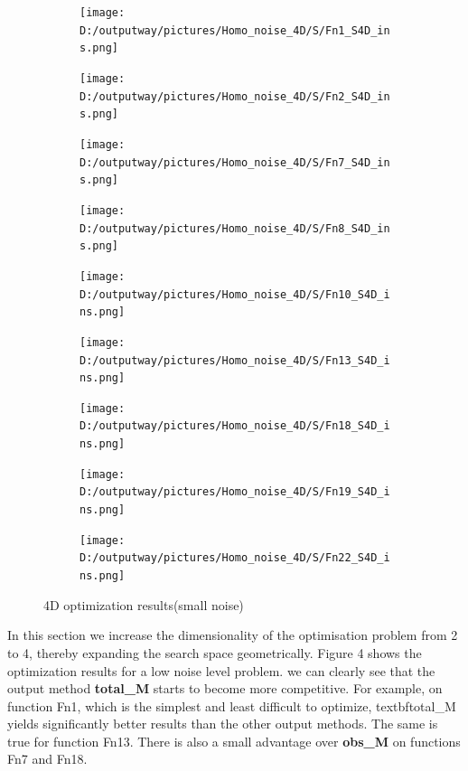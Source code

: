 \documentclass{article}
\begin{document}
\begin{figure}[H]
    \centering
    \begin{subfigure}[t]{.32\linewidth}
        \centering
        \texttt{[image: D:/outputway/pictures/Homo\_noise\_4D/S/Fn1\_S4D\_ins.png]}
    \end{subfigure}
    \begin{subfigure}[t]{.32\linewidth}
        \centering
        \texttt{[image: D:/outputway/pictures/Homo\_noise\_4D/S/Fn2\_S4D\_ins.png]}
    \end{subfigure}
    \begin{subfigure}[t]{.32\linewidth}
        \centering
        \texttt{[image: D:/outputway/pictures/Homo\_noise\_4D/S/Fn7\_S4D\_ins.png]}
    \end{subfigure}
    \begin{subfigure}[t]{.32\linewidth}
        \centering
        \texttt{[image: D:/outputway/pictures/Homo\_noise\_4D/S/Fn8\_S4D\_ins.png]}
    \end{subfigure}
    \begin{subfigure}[t]{.32\linewidth}
        \centering
        \texttt{[image: D:/outputway/pictures/Homo\_noise\_4D/S/Fn10\_S4D\_ins.png]}
    \end{subfigure}
    \begin{subfigure}[t]{.32\linewidth}
        \centering
        \texttt{[image: D:/outputway/pictures/Homo\_noise\_4D/S/Fn13\_S4D\_ins.png]}
    \end{subfigure}
    \begin{subfigure}[t]{.32\linewidth}
        \centering
        \texttt{[image: D:/outputway/pictures/Homo\_noise\_4D/S/Fn18\_S4D\_ins.png]}
    \end{subfigure}
    \begin{subfigure}[t]{.32\linewidth}
        \centering
        \texttt{[image: D:/outputway/pictures/Homo\_noise\_4D/S/Fn19\_S4D\_ins.png]}
    \end{subfigure}
    \begin{subfigure}[t]{.32\linewidth}
        \centering
        \texttt{[image: D:/outputway/pictures/Homo\_noise\_4D/S/Fn22\_S4D\_ins.png]}
    \end{subfigure}
    \caption{4D optimization results(small noise)}
    \label{Fig4}
\end{figure}

\hspace{2em}In this section we increase the dimensionality of the optimisation problem from 2 to 4, thereby expanding the search space geometrically. Figure 4 shows the optimization results for a low noise level problem. we can clearly see that the output method \textbf{total\_M} starts to become more competitive. For example, on function Fn1, which is the simplest and least difficult to optimize, textbf{total\_M} yields significantly better results than the other output methods. The same is true for function Fn13. There is also a small advantage over \textbf{obs\_M} on functions Fn7 and Fn18. 
\end{document}
